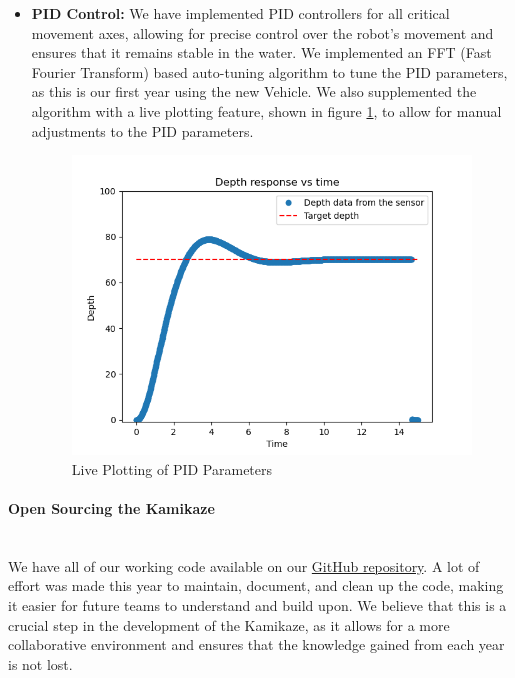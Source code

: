 \begin{itemize}[leftmargin=0pt, itemindent=10pt]
    \item \textbf{PID Control:} We have implemented PID controllers for all critical movement axes, allowing for precise control over the robot's movement and ensures that it remains stable in the water. We implemented an FFT (Fast Fourier Transform) based auto-tuning algorithm to tune the PID parameters, as this is our first year using the new Vehicle. We also supplemented the algorithm with a live
    plotting feature, shown in figure \ref{fig:pid_live}, to allow for manual adjustments to the PID parameters.
    \begin{figure}[h]
    \centering
    \includegraphics[width=\columnwidth]{Sections/2Design Rationale/images/Pid.png}
    \caption{Live Plotting of PID Parameters}
    \label{fig:pid_live}
    \end{figure}
\end{itemize}

\vspace{-1cm}
\paragraph{Open Sourcing the Kamikaze} \ \\
We have all of our working code available on our \href{https://github.com/ejustroboticsclub/MATE-ROV-2025}{GitHub repository}. A lot of effort was made this year to maintain, document, and clean up the code, making it easier for future teams to understand and build upon. We believe that this is a crucial step in the development of the Kamikaze, as it allows for a more collaborative environment and ensures that the knowledge gained from each year is not lost.



